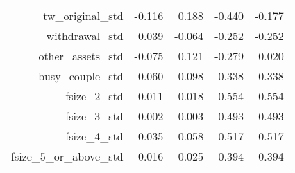 \documentclass[10pt,a4paper]{article}
\begin{document}
\begin{tiny}
\begin{table}[ht]
\begin{tabular}{rrrrr}
  tw\_original\_std & -0.116 & 0.188 & -0.440 & -0.177 \\ 
  withdrawal\_std & 0.039 & -0.064 & -0.252 & -0.252 \\ 
  other\_assets\_std & -0.075 & 0.121 & -0.279 & 0.020 \\ 
  busy\_couple\_std & -0.060 & 0.098 & -0.338 & -0.338 \\ 
  fsize\_2\_std & -0.011 & 0.018 & -0.554 & -0.554 \\ 
  fsize\_3\_std & 0.002 & -0.003 & -0.493 & -0.493 \\ 
  fsize\_4\_std & -0.035 & 0.058 & -0.517 & -0.517 \\ 
  fsize\_5\_or\_above\_std & 0.016 & -0.025 & -0.394 & -0.394 \\ 
\end{tabular}
\end{table}



\end{tiny}
\end{document}
